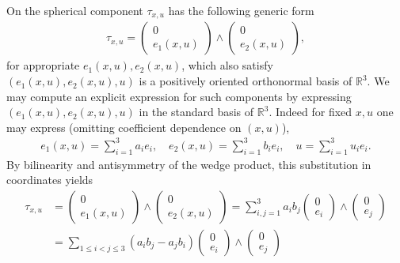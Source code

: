 \documentclass[sn-mathphys-num]{sn-jnl}%
\theoremstyle{thmstyleone}%
\theoremstyle{thmstyletwo}%
\theoremstyle{thmstylethree}%
\numberwithin{remark}{section}
\numberwithin{definition}{section}
\numberwithin{equation}{section}
\numberwithin{theorem}{section}
\newcommand{\R}{\ensuremath{\mathbb{R}}}%
\begin{document}
On the spherical component $\tau_{x,u}$ has the following generic form \cite{NCpaper} 
\begin{align*}
    \tau_{x,u} = \begin{pmatrix} 0 \\ e_1(x,u)  \end{pmatrix}\wedge  \begin{pmatrix} 0\\ e_2(x,u) \end{pmatrix},
\end{align*}
for appropriate $e_{1}(x,u),e_{2}(x,u)$, which also satisfy $(e_{1}(x,u),e_{2}(x,u),u)$ is a positively oriented orthonormal basis of $\R^{3}$. We may compute an explicit expression for such components by expressing $(e_{1}(x,u),e_{2}(x,u),u)$ in the standard basis of $\R^{3}$. Indeed for fixed $x,u$ one may express (omitting coefficient dependence on $(x,u)$),
\begin{align*}
    e_{1}(x,u) = \sum_{i=1}^{3}{a_{i}e_{i}},\quad e_{2}(x,u) = \sum_{i=1}^{3}{b_{i}e_{i} },\quad u = \sum_{i=1}^{3}{u_{i}e_{i}}.
\end{align*}
By bilinearity and antisymmetry of the wedge product, this substitution in coordinates yields
\begin{align*}
    \tau_{x,u} &= \begin{pmatrix} 0 \\ e_1(x,u)  \end{pmatrix}\wedge  \begin{pmatrix} 0\\ e_2(x,u) \end{pmatrix} = \sum_{i,j=1}^{3}{a_{i}b_{j}\begin{pmatrix} 0 \\ e_i  \end{pmatrix}\wedge  \begin{pmatrix} 0\\ e_j \end{pmatrix}}\\
&    =\sum_{1\leq i<j\leq 3 }{(a_{i}b_{j} - a_{j}b_{i})\begin{pmatrix} 0 \\ e_i  \end{pmatrix}\wedge  \begin{pmatrix} 0\\ e_j \end{pmatrix}  }
\end{align*}
\end{document}
